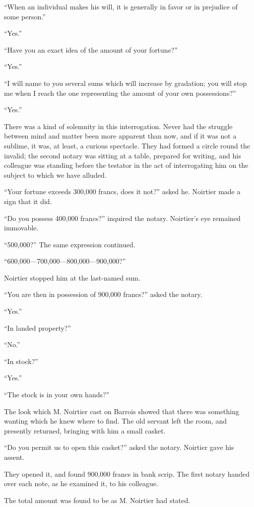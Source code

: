 “When an individual makes his will, it is generally in favor or in
prejudice of some person.”

“Yes.”

“Have you an exact idea of the amount of your fortune?”

“Yes.”

“I will name to you several sums which will increase by gradation; you
will stop me when I reach the one representing the amount of your own
possessions?”

“Yes.”

There was a kind of solemnity in this interrogation. Never had the
struggle between mind and matter been more apparent than now, and if it
was not a sublime, it was, at least, a curious spectacle. They had
formed a circle round the invalid; the second notary was sitting at a
table, prepared for writing, and his colleague was standing before the
testator in the act of interrogating him on the subject to which we
have alluded.

“Your fortune exceeds 300,000 francs, does it not?” asked he. Noirtier
made a sign that it did.

“Do you possess 400,000 francs?” inquired the notary. Noirtier’s eye
remained immovable.

“500,000?” The same expression continued.

“600,000—700,000—800,000—900,000?”

Noirtier stopped him at the last-named sum.

“You are then in possession of 900,000 francs?” asked the notary.

“Yes.”

“In landed property?”

“No.”

“In stock?”

“Yes.”

“The stock is in your own hands?”

The look which M. Noirtier cast on Barrois showed that there was
something wanting which he knew where to find. The old servant left the
room, and presently returned, bringing with him a small casket.

“Do you permit us to open this casket?” asked the notary. Noirtier gave
his assent.

They opened it, and found 900,000 francs in bank scrip. The first
notary handed over each note, as he examined it, to his colleague.

The total amount was found to be as M. Noirtier had stated.


